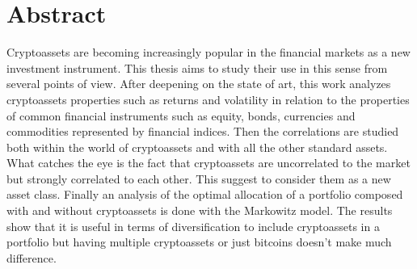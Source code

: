 \chapter{Abstract}
\label{chpr:abstract}


Cryptoassets are becoming increasingly popular in the financial markets as a new investment instrument. This thesis aims to study their use in this sense from several points of view. After deepening on the state of art, this work analyzes cryptoassets properties such as returns and volatility in relation to the properties of common financial instruments such as equity, bonds, currencies and commodities represented by financial indices. Then the correlations are studied both within the world of cryptoassets and with all the other standard assets. What catches the eye is the fact that cryptoassets are uncorrelated to the market but strongly correlated to each other. This suggest to consider them as a new asset class.
Finally an analysis of the optimal allocation of a portfolio composed with and without cryptoassets is done with the Markowitz model.
The results show that it is useful in terms of diversification to include cryptoassets in a portfolio but having multiple cryptoassets or just bitcoins doesn't make much difference.
